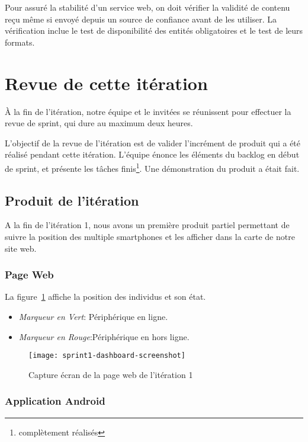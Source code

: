 Pour assuré la stabilité d'un service web, on doit vérifier la validité de
contenu reçu même si envoyé depuis un source de confiance avant de les
utiliser. La vérification inclue le test de disponibilité des entités
obligatoires et le test de leurs formats.

\section{Revue de cette itération}

À la fin de l'itération, notre équipe et le  invitées
se réunissent pour effectuer la revue de sprint, qui dure au maximum deux
heures.

L'objectif de la revue de l'itération est de valider l'incrément de produit qui
a été réalisé pendant cette itération. L'équipe énonce les éléments du backlog
en début de sprint, et présente les tâches finis\footnote{complètement
réalisés}. Une démonstration du produit a était fait.

\subsection{Produit de l'itération}

A la fin de l'itération 1, nous avons un première produit partiel permettant de
suivre la position des multiple smartphones et les afficher dans la carte de
notre site web.

\subsubsection{Page Web }
La figure~\ref{fig:sprint1-dashboard-screenshot} affiche la position des
individus et son état.

\begin{itemize}
    \item \textit{Marqueur en Vert}: Périphérique en ligne.
    \item \textit{Marqueur en Rouge}:Périphérique en hors ligne.
\end{itemize}

\begin{figure}[H]
    \centering
    \texttt{[image: sprint1-dashboard-screenshot]}
    \caption{Capture écran de la page web de l'itération 1}
\label{fig:sprint1-dashboard-screenshot}
\end{figure}

\subsubsection{Application Android}

